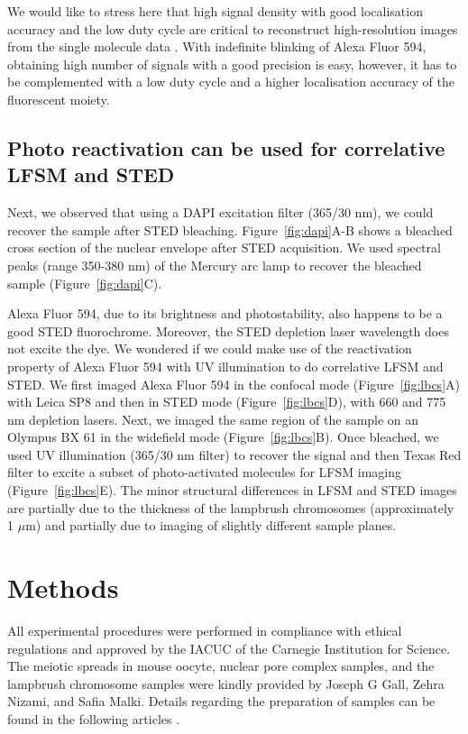 \documentclass[9pt,twocolumn,twoside]{pnas-new}
\begin{document}
We would like to stress here that high signal density with good localisation accuracy and the low duty cycle are critical to reconstruct high-resolution images from the single molecule data \citep{dempsey2011evaluation,legant2016high, ha2012photophysics}. With indefinite blinking of Alexa Fluor 594, obtaining high number of signals with a good precision is easy, however, it has to be complemented with a low duty cycle and a higher localisation accuracy of the fluorescent moiety. 

\subsection*{Photo reactivation can be used for correlative LFSM and STED}

Next, we observed that using a DAPI excitation filter (365/30 nm), we could recover the sample after STED bleaching. Figure~\ref{fig:dapi}A-B shows a bleached cross section of the nuclear envelope after STED acquisition.  We used spectral peaks (range 350-380 nm) of the Mercury arc lamp to recover the bleached sample (Figure~\ref{fig:dapi}C).

Alexa Fluor 594, due to its brightness and photostability, also happens to be a good STED fluorochrome. Moreover, the STED depletion laser wavelength does not excite the dye. We wondered if we could make use of the reactivation property of Alexa Fluor 594 with UV illumination to do correlative LFSM and STED. We first imaged Alexa Fluor 594 in the confocal mode (Figure~\ref{fig:lbcs}A) with Leica SP8 and then in STED mode (Figure~\ref{fig:lbcs}D), with 660 and 775 nm depletion lasers. Next, we imaged the same region of the sample on an Olympus BX 61 in the widefield mode (Figure~\ref{fig:lbcs}B).  Once bleached, we used UV illumination (365/30 nm filter) to recover the signal and then Texas Red filter to excite a subset of photo-activated molecules for LFSM imaging (Figure~\ref{fig:lbcs}E). The minor structural differences in LFSM and STED images are partially due to the thickness of the lampbrush chromosomes (approximately 1 $\mu$m) and partially due to imaging of slightly different sample planes.  


\section*{Methods}
All experimental procedures were performed in compliance with ethical regulations and approved by the IACUC of the Carnegie Institution for Science. The meiotic spreads in mouse oocyte, nuclear pore complex samples, and the lampbrush chromosome samples were kindly provided by Joseph G Gall, Zehra Nizami, and Safia Malki. Details regarding the preparation of samples can be found in the following articles \citep{susiarjo2009analyzing,malki2017epigenetics,prakash2015superresolution, gall2016isolation, shi2017toxic}.
\end{document}
